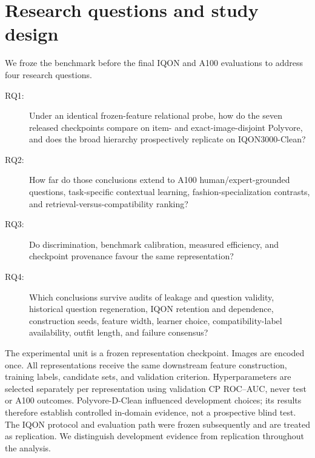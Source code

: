 \documentclass[pdflatex,sn-mathphys-num,iicol]{sn-jnl}
\begin{document}
\section{Research questions and study design}\label{sec:design}

We froze the benchmark before the final IQON and A100 evaluations to address four research questions.

\begin{description}
\item[RQ1:] Under an identical frozen-feature relational probe, how do the seven released checkpoints compare on item- and exact-image-disjoint Polyvore, and does the broad hierarchy prospectively replicate on IQON3000-Clean?
\item[RQ2:] How far do those conclusions extend to A100 human/expert-grounded questions, task-specific contextual learning, fashion-specialization contrasts, and retrieval-versus-compatibility ranking?
\item[RQ3:] Do discrimination, benchmark calibration, measured efficiency, and checkpoint provenance favour the same representation?
\item[RQ4:] Which conclusions survive audits of leakage and question validity, historical question regeneration, IQON retention and dependence, construction seeds, feature width, learner choice, compatibility-label availability, outfit length, and failure consensus?
\end{description}

The experimental unit is a frozen representation checkpoint. Images are encoded once. All representations receive the same downstream feature construction, training labels, candidate sets, and validation criterion. Hyperparameters are selected separately per representation using validation CP ROC--AUC, never test or A100 outcomes. Polyvore-D-Clean influenced development choices; its results therefore establish controlled in-domain evidence, not a prospective blind test. The IQON protocol and evaluation path were frozen subsequently and are treated as replication. We distinguish development evidence from replication throughout the analysis.
\end{document}
